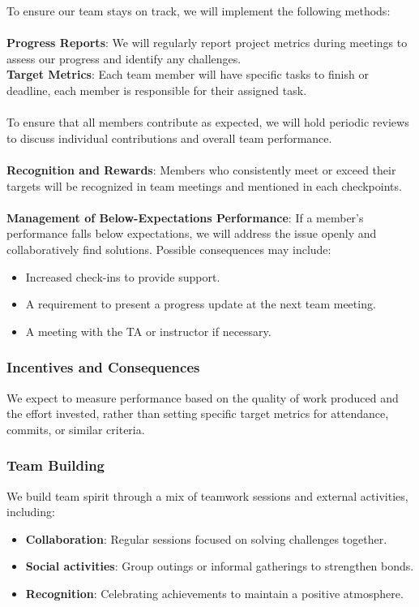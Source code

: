 \documentclass{article}
\begin{document}
To ensure our team stays on track, we will implement the following methods:\\\\
\textbf{Progress Reports}: We will regularly report project metrics during meetings to assess our progress and identify any challenges.\\
\textbf{Target Metrics}: Each team member will have specific tasks to finish or deadline, each member is responsible for their assigned task.\\\\
To ensure that all members contribute as expected, we will hold periodic reviews to discuss individual contributions and overall team performance. \\\\
\textbf{Recognition and Rewards}: Members who consistently meet or exceed their targets will be recognized in team meetings and mentioned in each checkpoints.\\\\
\textbf{Management of Below-Expectations Performance}: If a member's performance falls below expectations, we will address the issue openly and collaboratively find solutions. Possible consequences may include:
\begin{itemize}
    \item Increased check-ins to provide support.
    \item A requirement to present a progress update at the next team meeting.
    \item A meeting with the TA or instructor if necessary.
\end{itemize}

\subsubsection*{Incentives and Consequences}

We expect to measure performance based on the quality of work produced and the effort invested, rather than setting specific target metrics for attendance, commits, or similar criteria.

\subsubsection*{Team Building}

We build team spirit through a mix of teamwork sessions and external activities, including:
\begin{itemize}
    \item \textbf{Collaboration}: Regular sessions focused on solving challenges together.
    \item \textbf{Social activities}: Group outings or informal gatherings to strengthen bonds.
    \item \textbf{Recognition}: Celebrating achievements to maintain a positive atmosphere.
\end{itemize}
\end{document}

